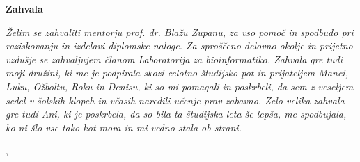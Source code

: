 \thispagestyle{empty}

\begin{center}
{\Large \textbf{\sc Zahvala}}
\end{center}
\vspace{0.5cm}

{\it\noindent
Želim se zahvaliti mentorju prof. dr. Blažu Zupanu, za vso pomoč in spodbudo pri raziskovanju in izdelavi diplomske naloge. Za sproščeno delovno okolje in prijetno vzdušje se zahvaljujem članom Laboratorija za bioinformatiko. Zahvala gre tudi moji družini, ki me je podpirala skozi celotno študijsko pot in prijateljem Manci, Luku, Ožboltu, Roku in Denisu, ki so mi pomagali in poskrbeli, da sem z veseljem sedel v šolskih klopeh in včasih naredili učenje prav zabavno.
Zelo velika zahvala gre tudi Ani, ki je poskrbela, da so bila ta študijska leta še lepša, me spodbujala, ko ni šlo vse tako kot mora in mi vedno stala ob strani.

\vspace{0.5cm} \hfill \tauthor, \myyear
}